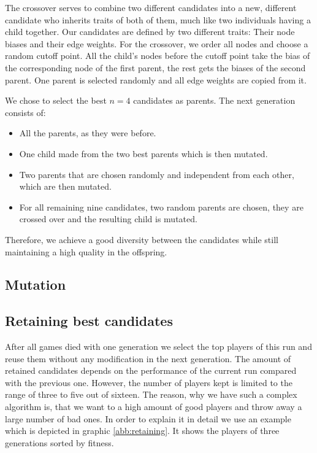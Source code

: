 \documentclass[a4paper,12pt,pagesize,headsepline,bibtotoc,titlepage,abstracton]{scrartcl}
\begin{document}
The crossover serves to combine two different candidates into a new, different candidate who inherits traits of both of them, much like two individuals having a child together. Our candidates are defined by two different traits: Their node biases and their edge weights. For the crossover, we order all nodes and choose a random cutoff point. All the child's nodes before the cutoff point take the bias of the corresponding node of the first parent, the rest gets the biases of the second parent. One parent is selected randomly and all edge weights are copied from it.

We chose to select the best $n=4$ candidates as parents. The next generation consists of:

\begin{itemize}
\item All the parents, as they were before.
\item One child made from the two best parents which is then mutated.
\item Two parents that are chosen randomly and independent from each other, which are then mutated.
\item For all remaining nine candidates, two random parents are chosen, they are crossed over and the resulting child is mutated.
\end{itemize}

Therefore, we achieve a good diversity between the candidates while still maintaining a high quality in the offspring.

\subsection{Mutation}
\subsection{Retaining best candidates}

After all games died with one generation we select the top players of this run and reuse them without any modification in the next generation. The amount of retained candidates depends on the performance of the current run compared with the previous one. However, the number of players kept is limited to the range of three to five out of sixteen. The reason, why we have such a complex algorithm is, that we want to a high amount of good players and throw away a large number of bad ones. In order to explain it in detail we use an example which is depicted in graphic \ref{abb:retaining}. It shows the players of three generations sorted by fitness.
\end{document}
